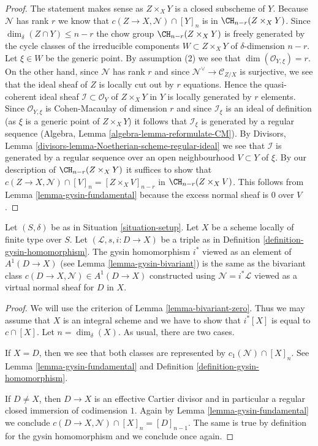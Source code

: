\begin{proof}
The statement makes sense as $Z \times_X Y$ is a closed subscheme of $Y$.
Because $\mathcal{N}$ has rank $r$ we know that
$c(Z \to X, \mathcal{N}) \cap [Y]_n$ is in $\CH_{n - r}(Z \times_X Y)$.
Since $\dim_\delta(Z \cap Y) \leq n - r$ the chow group
$\CH_{n - r}(Z \times_X Y)$ is freely generated by the
cycle classes of the irreducible components $W \subset Z \times_X Y$
of $\delta$-dimension $n - r$. Let $\xi \in W$ be the generic point.
By assumption (2) we see that $\dim(\mathcal{O}_{Y, \xi}) = r$.
On the other hand, since $\mathcal{N}$ has rank $r$ and since
$\mathcal{N}^\vee \to \mathcal{C}_{Z/X}$ is surjective, we see that
the ideal sheaf of $Z$ is locally cut out by $r$ equations.
Hence the quasi-coherent ideal sheaf $\mathcal{I} \subset \mathcal{O}_Y$
of $Z \times_X Y$ in $Y$ is locally generated by $r$ elements.
Since $\mathcal{O}_{Y, \xi}$ is Cohen-Macaulay of dimension $r$
and since $\mathcal{I}_\xi$ is an ideal of definition (as $\xi$ is
a generic point of $Z \times_X Y$) it follows that $\mathcal{I}_\xi$
is generated by a regular sequence
(Algebra, Lemma \ref{algebra-lemma-reformulate-CM}).
By Divisors, Lemma \ref{divisors-lemma-Noetherian-scheme-regular-ideal}
we see that $\mathcal{I}$ is generated by a regular sequence over
an open neighbourhood $V \subset Y$ of $\xi$. By our description of
$\CH_{n - r}(Z \times_X Y)$ it suffices to show that
$c(Z \to X, \mathcal{N}) \cap [V]_n = [Z \times_X V]_{n - r}$
in $\CH_{n - r}(Z \times_X V)$. This follows from
Lemma \ref{lemma-gysin-fundamental}
because the excess normal sheaf is $0$ over $V$.
\end{proof}

\begin{lemma}
\label{lemma-gysin-agrees}
Let $(S, \delta)$ be as in Situation \ref{situation-setup}. Let $X$ be a scheme
locally of finite type over $S$. Let $(\mathcal{L}, s, i : D \to X)$
be a triple as in Definition \ref{definition-gysin-homomorphism}.
The gysin homomorphism $i^*$ viewed as an element of $A^1(D \to X)$
(see Lemma \ref{lemma-gysin-bivariant}) is the same as the bivariant class
$c(D \to X, \mathcal{N}) \in A^1(D \to X)$
constructed using $\mathcal{N} = i^*\mathcal{L}$
viewed as a virtual normal sheaf for $D$ in $X$.
\end{lemma}

\begin{proof}
We will use the criterion of Lemma \ref{lemma-bivariant-zero}.
Thus we may assume that $X$ is an integral scheme and
we have to show that $i^*[X]$ is equal to $c \cap [X]$.
Let $n = \dim_\delta(X)$. As usual, there are two cases.

\medskip\noindent
If $X = D$, then we see that both classes are represented by
$c_1(\mathcal{N}) \cap [X]_n$. See Lemma \ref{lemma-gysin-fundamental}
and Definition \ref{definition-gysin-homomorphism}.

\medskip\noindent
If $D \not = X$, then $D \to X$ is an effective Cartier divisor
and in particular a regular closed immersion of codimension $1$.
Again by Lemma \ref{lemma-gysin-fundamental} we conclude
$c(D \to X, \mathcal{N}) \cap [X]_n = [D]_{n - 1}$. The same
is true by definition for the gysin homomorphism and we conclude
once again.
\end{proof}


